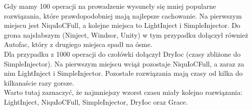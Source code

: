 \documentclass[12pt]{article}
\begin{document}
Gdy mamy 100 operacji na prowadzenie wysuneły się mniej popularne rozwiązania, które prawdopodobniej mają najlepsze cachowanie. Na pierwszym miejscu jest NiquIoCFull, a kolejne miejsca to LightInject i SimpleInjector. Do grona najsłabszym (Ninject, Windsor, Unity) w tym przypadku dołączył również Autofac, który z drugiego miejsca spadł na ósme.\\
Dla przypadku z 1000 operacji do czołówki dołączył DryIoc (czasy zbliżone do SimpleInjector). Na pierwszym miejscu wciąż pozostaje NiquIoCFull, a zaraz za nim LightInject i SimpleInjector. Pozostałe rozwiązania mają czasy od kilka do kilkanaście razy gorsze.\\
Warto tutaj zaznaczyć, że najmniejszy wzorst czasu miały kolejno rozwiązania: LightInject, NiquIoCFull, SimpleInjector, DryIoc oraz Grace.

\clearpage
\end{document}
